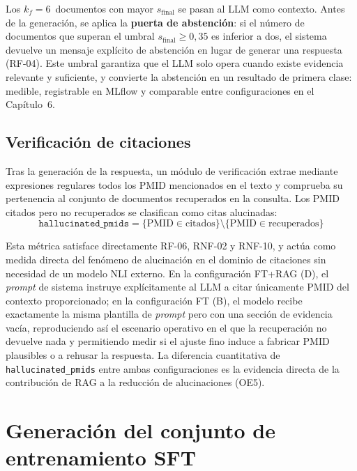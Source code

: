 \documentclass[11pt,a4paper,spanish]{book}
\numberwithin{equation}{chapter}
\numberwithin{figure}{chapter}
\begin{document}
Los $k_f = 6$~documentos con mayor $s_{\text{final}}$ se pasan al LLM como contexto. Antes de la generación, se aplica la \textbf{puerta de abstención}: si el número de documentos que superan el umbral $s_{\text{final}} \geq 0{,}35$ es inferior a dos, el sistema devuelve un mensaje explícito de abstención en lugar de generar una respuesta (RF-04). Este umbral garantiza que el LLM solo opera cuando existe evidencia relevante y suficiente, y convierte la abstención en un resultado de primera clase: medible, registrable en MLflow y comparable entre configuraciones en el Capítulo~6.

\subsection{Verificación de citaciones}
\label{sec:c5_citation}

Tras la generación de la respuesta, un módulo de verificación extrae mediante expresiones regulares todos los PMID mencionados en el texto y comprueba su pertenencia al conjunto de documentos recuperados en la consulta. Los PMID citados pero no recuperados se clasifican como citas alucinadas:
\begin{equation}
  \texttt{hallucinated\_pmids} = \{\mathrm{PMID} \in \text{citados}\} \setminus \{\mathrm{PMID} \in \text{recuperados}\}
\end{equation}

Esta métrica satisface directamente RF-06, RNF-02 y RNF-10, y actúa como medida directa del fenómeno de alucinación en el dominio de citaciones \cite{ji_survey_2023, pal_med-halt_2023} sin necesidad de un modelo NLI externo. En la configuración FT+RAG (D), el \textit{prompt} de sistema instruye explícitamente al LLM a citar únicamente PMID del contexto proporcionado; en la configuración FT (B), el modelo recibe exactamente la misma plantilla de \textit{prompt} pero con una sección de evidencia vacía, reproduciendo así el escenario operativo en el que la recuperación no devuelve nada y permitiendo medir si el ajuste fino induce a fabricar PMID plausibles o a rehusar la respuesta. La diferencia cuantitativa de \texttt{hallucinated\_pmids} entre ambas configuraciones es la evidencia directa de la contribución de RAG a la reducción de alucinaciones (OE5).

\section{Generación del conjunto de entrenamiento SFT}
\label{sec:c5_sft}
\end{document}
